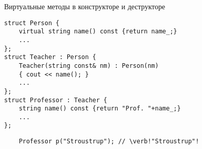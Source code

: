 \documentclass{beamer}
\begin{document}
\begin{frame}[fragile]{Виртуальные методы в конструкторе и деструкторе}
    \begin{lstlisting}
struct Person {
    virtual string name() const {return name_;}
    ...
};
struct Teacher : Person {
    Teacher(string const& nm) : Person(nm)
    { cout << name(); }
    ...
};
struct Professor : Teacher {
    string name() const {return "Prof. "+name_;}
    ...
};
    \end{lstlisting}
\begin{lstlisting}
    Professor p("Stroustrup"); // \verb!"Stroustrup"!
\end{lstlisting}

\end{frame}
\end{document}

